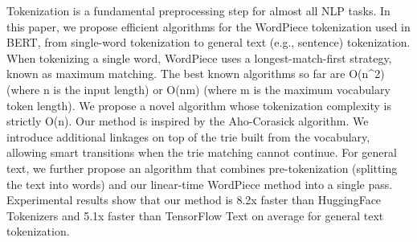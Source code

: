 Tokenization is a fundamental preprocessing step for almost all NLP tasks. In this paper, we propose efficient algorithms for the WordPiece tokenization used in BERT, from single-word tokenization to general text (e.g., sentence) tokenization. When tokenizing a single word, WordPiece uses a longest-match-first strategy, known as maximum matching. The best known algorithms so far are O(n^2) (where n is the input length) or O(nm) (where m is the maximum vocabulary token length). We propose a novel algorithm whose tokenization complexity is strictly O(n).  Our method is inspired by the Aho-Corasick algorithm. We introduce additional linkages on top of the trie built from the vocabulary, allowing smart transitions when the trie matching cannot continue.  For general text, we further propose an algorithm that combines pre-tokenization (splitting the text into words) and our linear-time WordPiece method into a single pass. Experimental results show that our method is 8.2x faster than HuggingFace Tokenizers and 5.1x faster than TensorFlow Text on average for general text tokenization.
